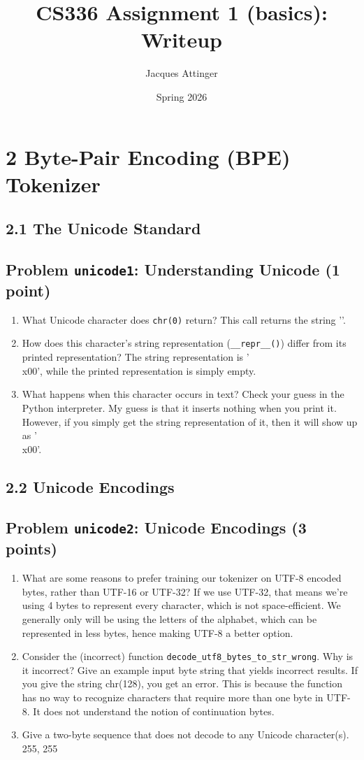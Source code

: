 \documentclass[11pt]{article}
\title{CS336 Assignment 1 (basics): Writeup}
\author{Jacques Attinger}
\date{Spring 2026}
\newcommand{\problem}[2]{%
  \subsection*{Problem \texttt{#1}: #2}%
}
\begin{document}
\maketitle

\section*{2 Byte-Pair Encoding (BPE) Tokenizer}

\subsection*{2.1 The Unicode Standard}

\problem{unicode1}{Understanding Unicode (1 point)}

\begin{enumerate}[label=(\alph*)]
  \item What Unicode character does \texttt{chr(0)} return?
  This call returns the string ''.
  \item How does this character's string representation (\texttt{\_\_repr\_\_()}) differ from its printed representation?
  The string representation is '\\x00', while the printed representation is simply empty.
  \item What happens when this character occurs in text? Check your guess in the Python interpreter.
  My guess is that it inserts nothing when you print it. However, if you simply get the string representation of it, then it will show up as '\\x00'.
\end{enumerate}

\subsection*{2.2 Unicode Encodings}

\problem{unicode2}{Unicode Encodings (3 points)}

\begin{enumerate}[label=(\alph*)]
  \item What are some reasons to prefer training our tokenizer on UTF-8 encoded bytes, rather than UTF-16 or UTF-32?
  If we use UTF-32, that means we're using 4 bytes to represent every character, which is not space-efficient. We generally only will be using the letters of the alphabet, which can be represented in less bytes, hence making UTF-8 a better option.
  \item Consider the (incorrect) function \texttt{decode\_utf8\_bytes\_to\_str\_wrong}. Why is it incorrect? Give an example input byte string that yields incorrect results.
  If you give the string chr(128), you get an error. This is because the function has no way to recognize characters that require more than one byte in UTF-8. It does not understand the notion of continuation bytes.
  \item Give a two-byte sequence that does not decode to any Unicode character(s).
  255, 255
\end{enumerate}
\end{document}

